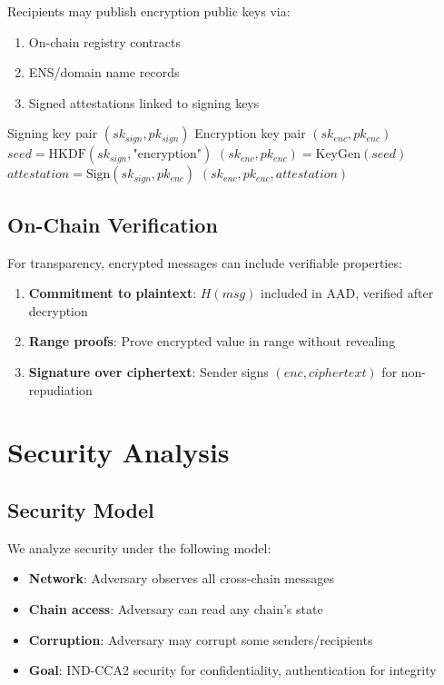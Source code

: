 \documentclass[11pt,a4paper]{article}
\begin{document}
Recipients may publish encryption public keys via:
\begin{enumerate}
    \item On-chain registry contracts
    \item ENS/domain name records
    \item Signed attestations linked to signing keys
\end{enumerate}

\begin{algorithm}
\caption{DeriveEncryptionKey}
\begin{algorithmic}[1]
\Require Signing key pair $(sk_{sign}, pk_{sign})$
\Ensure Encryption key pair $(sk_{enc}, pk_{enc})$
\State $seed = \text{HKDF}(sk_{sign}, \text{"encryption"})$
\State $(sk_{enc}, pk_{enc}) = \text{KeyGen}(seed)$
\State $attestation = \text{Sign}(sk_{sign}, pk_{enc})$
\State \Return $(sk_{enc}, pk_{enc}, attestation)$
\end{algorithmic}
\end{algorithm}

\subsection{On-Chain Verification}

For transparency, encrypted messages can include verifiable properties:

\begin{enumerate}
    \item \textbf{Commitment to plaintext}: $H(msg)$ included in AAD, verified after decryption
    \item \textbf{Range proofs}: Prove encrypted value in range without revealing
    \item \textbf{Signature over ciphertext}: Sender signs $(enc, ciphertext)$ for non-repudiation
\end{enumerate}

\section{Security Analysis}

\subsection{Security Model}

We analyze security under the following model:
\begin{itemize}
    \item \textbf{Network}: Adversary observes all cross-chain messages
    \item \textbf{Chain access}: Adversary can read any chain's state
    \item \textbf{Corruption}: Adversary may corrupt some senders/recipients
    \item \textbf{Goal}: IND-CCA2 security for confidentiality, authentication for integrity
\end{itemize}
\end{document}
